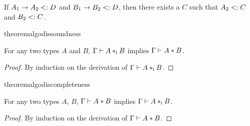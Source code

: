 \begin{lemma} \label{lemma:common-supertype}
  If $A_1 \to A_2 <: D$ and $B_1 \to B_2 <: D$,
  then there exists a $C$ such that $A_2 <: C$ and $B_2 <: C$.
\end{lemma}

\begin{restatable}{theorem}{algodissoundness}
  \label{theorem:soundness}

  For any two types $A$ and $B$, $\Gamma \vdash A *_\textnormal{i} B$ implies $\Gamma \vdash A * B$.
\end{restatable}

\begin{proof}
  By induction on the derivation of $\Gamma \vdash A *_\textnormal{i} B$.
\end{proof}

\begin{restatable}{theorem}{algodiscompleteness}
  \label{theorem:completeness}

  For any two types $A$, $B$, $\Gamma \vdash A * B$ implies $\Gamma \vdash A *_\textnormal{i} B$.
\end{restatable}

\begin{proof}
  By induction on the derivation of $\Gamma \vdash A * B$.
\end{proof}
